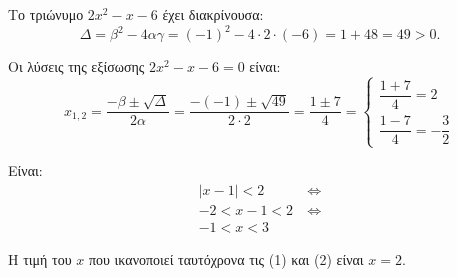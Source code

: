 
\begin{alist}
\item Το τριώνυμο $2x^2 - x - 6$ έχει διακρίνουσα:
\[\Delta = \beta^2 - 4\alpha\gamma = (-1)^2 - 4 \cdot 2 \cdot (-6) = 1 + 48 = 49 > 0.\]

Οι λύσεις της εξίσωσης $2x^2 - x - 6 = 0$ είναι:
\[x_{1,2} = \dfrac{-\beta \pm \sqrt{\Delta}}{2\alpha} = \dfrac{-(-1) \pm \sqrt{49}}{2 \cdot 2} = \dfrac{1 \pm 7}{4} = \begin{cases} \dfrac{1 + 7}{4} = 2 \\ \dfrac{1 - 7}{4} = -\dfrac{3}{2} \end{cases}\]

\item Είναι:
\begin{align*}
|x - 1| < 2 \ &\Leftrightarrow \\
-2 < x - 1 < 2 \ &\Leftrightarrow \\
-1 < x < 3&
\end{align*}

\item Η τιμή του $x$ που ικανοποιεί ταυτόχρονα τις (1) και (2) είναι $x = 2$.
\end{alist}

